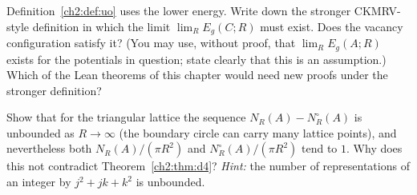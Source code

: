 \begin{exercise}[Discussion]\label{ch2:ex:lim}
Definition~\ref{ch2:def:uo} uses the lower energy. Write down the stronger CKMRV-style definition in which the limit
$\lim_RE_g(C;R)$ must exist. Does the vacancy configuration satisfy it? (You may use, without proof, that
$\lim_RE_g(A;R)$ exists for the potentials in question; state clearly that this is an assumption.) Which of the Lean
theorems of this chapter would need new proofs under the stronger definition?
\end{exercise}

\begin{exercise}\label{ch2:ex:d4count}
Show that for the triangular lattice the sequence $N_R(A)-N^\circ_R(A)$ is unbounded as $R\to\infty$ (the boundary
circle can carry many lattice points), and nevertheless both $N_R(A)/(\pi R^2)$ and $N^\circ_R(A)/(\pi R^2)$ tend to $1$.
Why does this not contradict Theorem~\ref{ch2:thm:d4}? \emph{Hint:} the number of representations of an integer by
$j^2+jk+k^2$ is unbounded.
\end{exercise}
